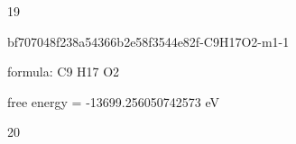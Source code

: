 \documentclass{article}
\begin{document}
19

\vspace{1cm}


bf707048f238a54366b2e58f3544e82f-C9H17O2-m1-1



formula: C9 H17 O2



free energy = -13699.256050742573 eV

20
\end{document}
